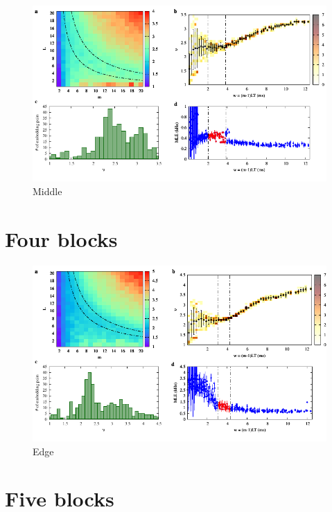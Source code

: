 \begin{figure}[H]
    \centering
    \includegraphics[width=\linewidth]{../3_blocks/middle/2e5_points/plots/chaos_low.pdf}
    \caption{Middle}
    \label{fig:3 blocks chaos middle}
\end{figure}

\section{Four blocks}

\begin{figure}[H]
    \centering
    \includegraphics[width=\linewidth]{../4_blocks/2e5_points_new/plots/chaos_low.pdf}
    \caption{Edge}
    \label{fig:4 blocks chaos}
\end{figure}


\section{Five blocks}

